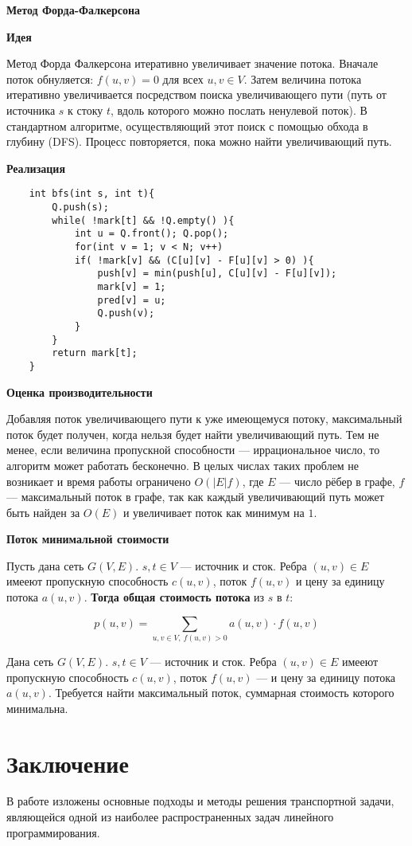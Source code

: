 \documentclass[a4paper,12pt]{article}
\begin{document}
	\textbf{Метод Форда-Фалкерсона}
	
	\textbf{Идея}
	
	Метод Форда Фалкерсона итеративно увеличивает значение потока. Вначале поток обнуляется: $f(u,v) = 0$ для всех $u, v \in V$. Затем величина потока итеративно увеличивается посредством поиска увеличивающего пути (путь от источника $s$ к стоку $t$, вдоль которого можно послать ненулевой поток). В стандартном алгоритме, осуществляющий этот поиск с помощью обхода в глубину (DFS). Процесс повторяется, пока можно найти увеличивающий путь.
	
	\textbf{Реализация}
	
	\begin{lstlisting}
	int bfs(int s, int t){
		Q.push(s);
		while( !mark[t] && !Q.empty() ){
			int u = Q.front(); Q.pop();
			for(int v = 1; v < N; v++)
			if( !mark[v] && (C[u][v] - F[u][v] > 0) ){
				push[v] = min(push[u], C[u][v] - F[u][v]);
				mark[v] = 1;
				pred[v] = u;
				Q.push(v);
			}
		}	
		return mark[t];
	}
	\end{lstlisting}

	\textbf{Оценка производительности}
	
	Добавляя поток увеличивающего пути к уже имеющемуся потоку, максимальный поток будет получен, когда нельзя будет найти увеличивающий путь. Тем не менее, если величина пропускной способности — иррациональное число, то алгоритм может работать бесконечно. В целых числах таких проблем не возникает и время работы ограничено $O(|E|f)$, где $E$ — число рёбер в графе, $f$ — максимальный поток в графе, так как каждый увеличивающий путь может быть найден за $O(E)$ и увеличивает поток как минимум на $1$.
	
	\textbf{Поток минимальной стоимости}
	
	Пусть дана сеть $G(V,E)$. $s,t \in V$ — источник и сток. Ребра $(u,v) \in E$ имееют пропускную способность $c(u,v)$, поток $f(u,v)$ и цену за единицу потока $a(u,v)$. \textbf{Тогда общая стоимость потока} из $s$ в $t$:
	
	\[
		p(u,v) = \sum\limits_{u,v \in V, \ f(u,v) > 0} a(u,v) \cdot f(u,v)
	\]
	
	Дана сеть $G(V,E)$. $s,t \in V$ — источник и сток. Ребра $(u,v) \in E$ имееют пропускную способность $c(u,v)$, поток $f(u,v)$ — и цену за единицу потока $a(u,v)$. Требуется найти максимальный поток, суммарная стоимость которого минимальна.
	
	
	\clearpage
	
\section{Заключение}
	В работе изложены основные подходы и методы решения транспортной задачи, являющейся одной из наиболее распространенных задач линейного программирования. 
	
\end{document}
